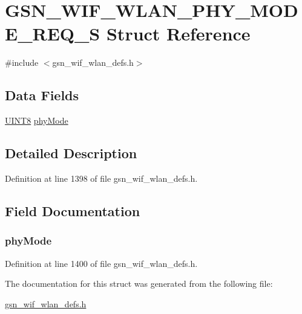 \hypertarget{a00393}{
\section{GSN\_\-WIF\_\-WLAN\_\-PHY\_\-MODE\_\-REQ\_\-S Struct Reference}
\label{a00393}
}


{\ttfamily \#include $<$gsn\_\-wif\_\-wlan\_\-defs.h$>$}

\subsection*{Data Fields}
\begin{DoxyCompactItemize}
\item 
\hyperlink{a00660_gab27e9918b538ce9d8ca692479b375b6a}{UINT8} \hyperlink{a00393_aa7e565866b09d31d3e28b57ec668dc07}{phyMode}
\end{DoxyCompactItemize}


\subsection{Detailed Description}


Definition at line 1398 of file gsn\_\-wif\_\-wlan\_\-defs.h.



\subsection{Field Documentation}
\hypertarget{a00393_aa7e565866b09d31d3e28b57ec668dc07}{
\subsubsection[{phyMode}]{ {\bf phyMode}}}
\label{a00393_aa7e565866b09d31d3e28b57ec668dc07}


Definition at line 1400 of file gsn\_\-wif\_\-wlan\_\-defs.h.



The documentation for this struct was generated from the following file:\begin{DoxyCompactItemize}
\item 
\hyperlink{a00613}{gsn\_\-wif\_\-wlan\_\-defs.h}\end{DoxyCompactItemize}
